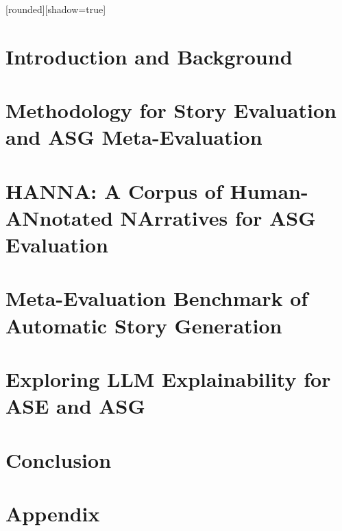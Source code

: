 \documentclass[xcolor=dvipsnames]{beamer}
\begin{document}
\makeFirstFrame

[rounded][shadow=true]



\begin{frame}{\plan}
  \tableofcontents
\end{frame}

\section[Introduction]{Introduction and Background}


\section[Methodology]{Methodology for Story Evaluation and ASG Meta-Evaluation}


\section[HANNA Corpus]{HANNA: A Corpus of Human-ANnotated NArratives for ASG Evaluation}


\section[Meta-Evaluation Benchmark]{Meta-Evaluation Benchmark of Automatic Story Generation}


\section[LLM Explainability]{Exploring LLM Explainability for ASE and ASG}


\section{Conclusion}


\appendix

\section{Appendix}




\end{document}
